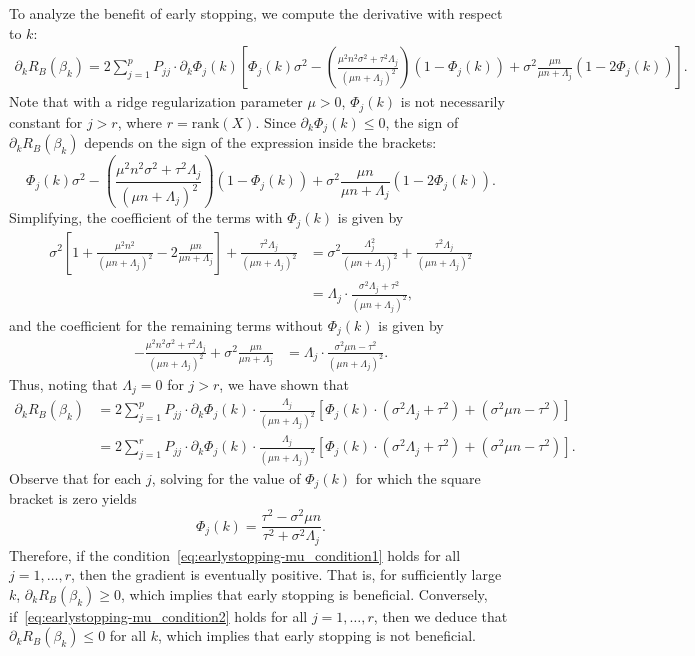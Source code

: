 \documentclass[11pt]{article}
\newenvironment{proof*}
  {\par\pushQED{\qed}\normalfont\ignorespaces}
  {\popQED\par}
\begin{document}
\begin{proof*}
\[\]
To analyze the benefit of early stopping, we compute the derivative with respect to $k$:
\begin{align*}
    \partial_k R_B(\beta_k) = 2 \sum_{j=1}^{p} P_{jj} \cdot \partial_k \Phi_j(k) \left[ \Phi_j(k)\sigma^2 - \left(\frac{\mu^2 n^2 \sigma^2 +  \tau^2\Lambda_j}{(\mu n + \Lambda_j)^2}\right)(1-\Phi_j(k)) + \sigma^2\frac{\mu n}{\mu n + \Lambda_j} (1 - 2\Phi_j(k)) \right].
\end{align*}
Note that with a ridge regularization parameter $\mu > 0$, $\Phi_j(k)$ is not necessarily constant for $j > r$, where $r = \mathrm{rank}(X)$.
Since $\partial_k \Phi_j(k) \leq 0$, the sign of $\partial_k R_B(\beta_k)$ depends on the sign of the expression inside the brackets:
\[
   \Phi_j(k)\sigma^2 - \left(\frac{\mu^2 n^2 \sigma^2 +  \tau^2\Lambda_j}{(\mu n + \Lambda_j)^2}\right)(1-\Phi_j(k)) + \sigma^2\frac{\mu n}{\mu n + \Lambda_j} (1 - 2\Phi_j(k)).
\]
Simplifying, the coefficient of the terms with $\Phi_j(k)$ is given by
\begin{align*}
    \sigma^2\left[1 + \frac{\mu^2 n^2 }{(\mu n + \Lambda_j)^2} - 2\frac{\mu n}{\mu n + \Lambda_j} \right] + \frac{ \tau^2\Lambda_j}{(\mu n + \Lambda_j)^2}
    &= \sigma^2 \frac{\Lambda_j^2}{(\mu n + \Lambda_j)^2} + \frac{ \tau^2\Lambda_j}{(\mu n + \Lambda_j)^2} \\
    &= \Lambda_j \cdot \frac{\sigma^2 \Lambda_j + \tau^2}{(\mu n + \Lambda_j)^2},
\end{align*}
and the coefficient for the remaining terms without $\Phi_j(k)$ is given by
\begin{align*}
    - \frac{\mu^2 n^2 \sigma^2 + \tau^2\Lambda_j}{(\mu n + \Lambda_j)^2}+ \sigma^2\frac{\mu n}{\mu n + \Lambda_j}
    &= \Lambda_j \cdot \frac{\sigma^2 \mu n - \tau^2}{(\mu n + \Lambda_j)^2}.
\end{align*}
Thus, noting that $\Lambda_j = 0$ for $j > r$, we have shown that
\begin{align}
    \partial_k R_B(\beta_k)
    &= 2 \sum_{j=1}^{p} P_{jj} \cdot \partial_k \Phi_j(k) \cdot \frac{\Lambda_j}{(\mu n + \Lambda_j)^2} \left[\Phi_j(k) \cdot (\sigma^2 \Lambda_j + \tau^2) + (\sigma^2 \mu n - \tau^2) \right] \nonumber\\
    &= 2 \sum_{j=1}^{r} P_{jj} \cdot \partial_k \Phi_j(k) \cdot \frac{\Lambda_j}{(\mu n + \Lambda_j)^2} \left[\Phi_j(k) \cdot (\sigma^2 \Lambda_j + \tau^2) + (\sigma^2 \mu n - \tau^2) \right]. \label{eq:risk-derivative}
\end{align}
Observe that for each $j$, solving for the value of $\Phi_j(k)$ for which the square bracket is zero yields
\[
    \Phi_j(k) = \frac{\tau^2 - \sigma^2 \mu n}{\tau^2 + \sigma^2 \Lambda_j}.
\]
Therefore, if the condition~\eqref{eq:earlystopping-mu_condition1} holds for all $j = 1, \ldots, r$, then the gradient is eventually positive. That is, for sufficiently large $k$, $\partial_k R_B(\beta_k) \geq 0$, which implies that early stopping is beneficial.
Conversely, if~\eqref{eq:earlystopping-mu_condition2} holds for all $j = 1, \ldots, r$, then we deduce that $\partial_k R_B(\beta_k) \leq 0$ for all $k$, which implies that early stopping is not beneficial.
\end{proof*}
\end{document}

